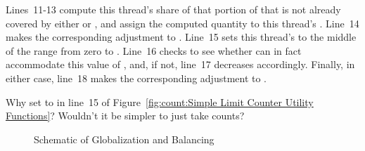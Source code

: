 Lines~11-13 compute this thread's share of that portion of
 that is not already covered by either
 or , and assign the
computed quantity to this thread's .
Line~14 makes the corresponding adjustment to .
Line~15 sets this thread's  to the middle of the range
from zero to .
Line~16 checks to see whether  can in fact accommodate
this value of , and, if not, line~17 decreases 
accordingly.
Finally, in either case, line~18 makes the corresponding adjustment to
.

\QuickQuiz{}
	Why set  to  in line~15 of
	Figure~\ref{fig:count:Simple Limit Counter Utility Functions}?
	Wouldn't it be simpler to just take  counts?
 \QuickQuizEnd

\begin{figure}[tb]
\begin{center}
\end{center}
\caption{Schematic of Globalization and Balancing}
\label{fig:count:Schematic of Globalization and Balancing}
\end{figure}

